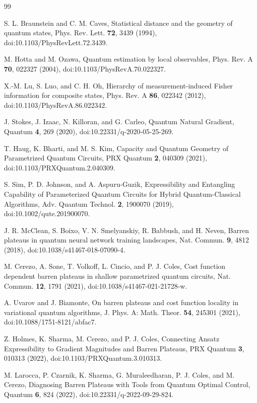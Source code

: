 \documentclass[aps,pra,reprint,superscriptaddress,nofootinbib,longbibliography]{revtex4-2}
\begin{document}
\begin{thebibliography}{99}

S. L. Braunstein and C. M. Caves,
Statistical distance and the geometry of quantum states,
Phys. Rev. Lett. \textbf{72}, 3439 (1994),
doi:10.1103/PhysRevLett.72.3439.

M. Hotta and M. Ozawa,
Quantum estimation by local observables,
Phys. Rev. A \textbf{70}, 022327 (2004),
doi:10.1103/PhysRevA.70.022327.

X.-M. Lu, S. Luo, and C. H. Oh,
Hierarchy of measurement-induced Fisher information for composite states,
Phys. Rev. A \textbf{86}, 022342 (2012),
doi:10.1103/PhysRevA.86.022342.

J. Stokes, J. Izaac, N. Killoran, and G. Carleo,
Quantum Natural Gradient,
Quantum \textbf{4}, 269 (2020),
doi:10.22331/q-2020-05-25-269.

T. Haug, K. Bharti, and M. S. Kim,
Capacity and Quantum Geometry of Parametrized Quantum Circuits,
PRX Quantum \textbf{2}, 040309 (2021),
doi:10.1103/PRXQuantum.2.040309.

S. Sim, P. D. Johnson, and A. Aspuru-Guzik,
Expressibility and Entangling Capability of Parameterized Quantum Circuits for Hybrid Quantum-Classical Algorithms,
Adv. Quantum Technol. \textbf{2}, 1900070 (2019),
doi:10.1002/qute.201900070.

J. R. McClean, S. Boixo, V. N. Smelyanskiy, R. Babbush, and H. Neven,
Barren plateaus in quantum neural network training landscapes,
Nat. Commun. \textbf{9}, 4812 (2018),
doi:10.1038/s41467-018-07090-4.

M. Cerezo, A. Sone, T. Volkoff, L. Cincio, and P. J. Coles,
Cost function dependent barren plateaus in shallow parametrized quantum circuits,
Nat. Commun. \textbf{12}, 1791 (2021),
doi:10.1038/s41467-021-21728-w.

A. Uvarov and J. Biamonte,
On barren plateaus and cost function locality in variational quantum algorithms,
J. Phys. A: Math. Theor. \textbf{54}, 245301 (2021),
doi:10.1088/1751-8121/abfac7.

Z. Holmes, K. Sharma, M. Cerezo, and P. J. Coles,
Connecting Ansatz Expressibility to Gradient Magnitudes and Barren Plateaus,
PRX Quantum \textbf{3}, 010313 (2022),
doi:10.1103/PRXQuantum.3.010313.

M. Larocca, P. Czarnik, K. Sharma, G. Muraleedharan, P. J. Coles, and M. Cerezo,
Diagnosing Barren Plateaus with Tools from Quantum Optimal Control,
Quantum \textbf{6}, 824 (2022),
doi:10.22331/q-2022-09-29-824.


\end{thebibliography}
\end{document}
